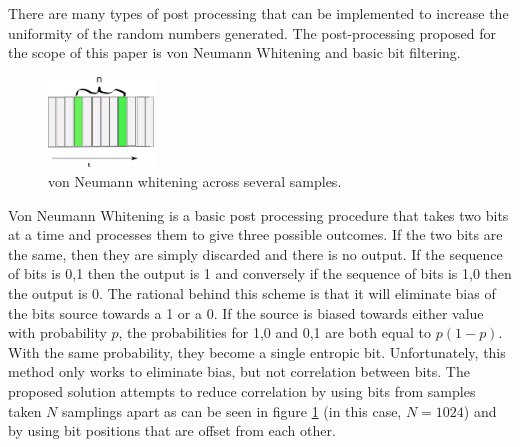 

There are many types of post processing that can be implemented to increase the
uniformity of the random numbers generated. The post-processing proposed for the
scope of this paper is von Neumann Whitening \cite{vn_whitening} and basic bit
filtering. 

\begin{figure}
	\centering
	\includegraphics[width=0.25\textwidth]{vn_whitening.png}
	\caption{von Neumann whitening across several samples.}
	\label{fig:vnw}
\end{figure}

Von Neumann Whitening is a basic post processing procedure that takes two bits
at a time and processes them to give three possible outcomes. If the two bits
are the same, then they are simply discarded and there is no output. If the
sequence of bits is 0,1 then the output is 1 and conversely if the sequence of
bits is 1,0 then the output is 0. The rational behind this scheme is that it
will eliminate bias of the bits source towards a 1 or a 0. If the source is
biased towards either value with probability $p$, the probabilities for 1,0 and
0,1 are both equal to $p(1-p)$. With the same probability, they become a single
entropic bit. Unfortunately, this method only works to eliminate bias, but not
correlation between bits. The proposed solution attempts to reduce correlation
by using bits from samples taken $N$ samplings apart as can be seen in figure
\ref{fig:vnw} (in this case, $N = 1024$) and by using bit positions that are
offset from each other. 

